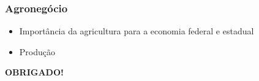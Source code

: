 \documentclass[12pt,aspectratio=169]{beamer}
\begin{document}
\begin{frame}
	\frametitle{Agronegócio}
	\begin{itemize}
		\item Importância da agricultura para a economia federal e estadual
		\item Produção
	\end{itemize}

\begin{figure}%
	\centering
	\qquad
\end{figure}


\end{frame}


\begin{frame}
	\begin{center}
		\color{primarycolor}
		\textbf{OBRIGADO!}
	\end{center}
	
	
\end{frame}
\end{document}
